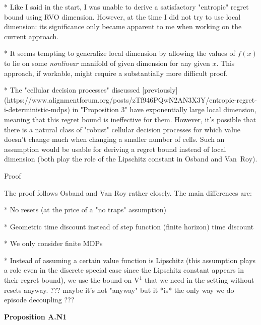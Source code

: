 \documentclass[a4paper]{article}
\newcommand{\Co}[1]{}
\newcommand{\V}{\mathrm{V}}
\begin{document}
* Like I said in the start, I was unable to derive a satisfactory "entropic" regret bound using RVO dimension. However, at the time I did not try to use local dimension: its significance only became apparent to me when working on the current approach.

* It seems tempting to generalize local dimension by allowing the values of $f(x)$ to lie on some \textit{nonlinear} manifold of given dimension for any given $x$. This approach, if workable, might require a substantially more difficult proof.

* The "cellular decision processes" discussed [previously](https://www.alignmentforum.org/posts/zTf946PQwN2AN3X3Y/entropic-regret-i-deterministic-mdps) in "Proposition 3" have exponentially large local dimension, meaning that this regret bound is ineffective for them. However, it's possible that there is a natural class of "robust" cellular decision processes for which value doesn't change much when changing a smaller number of cells. Such an assumption would be usable for deriving a regret bound instead of local dimension (both play the role of the Lipschitz constant in Osband and Van\ Roy).

\begin{Huge}Proof\end{Huge}

The proof follows Osband and Van Roy rather closely. The main differences are:

* No resets (at the price of a "no traps" assumption)

* Geometric time discount instead of step function (finite horizon) time discount

* We only consider finite MDPs

* Instead of assuming a certain value function is Lipschitz (this assumption plays a role even in the discrete special case since the Lipschitz constant appears in their regret bound), we use the bound on $\V^1$ that we need in the setting without resets anyway. ??? maybe it's not "anyway" but it *is* the only way we do episode decoupling ???

\textbf{Proposition A.N1}\Co{b}
\end{document}
